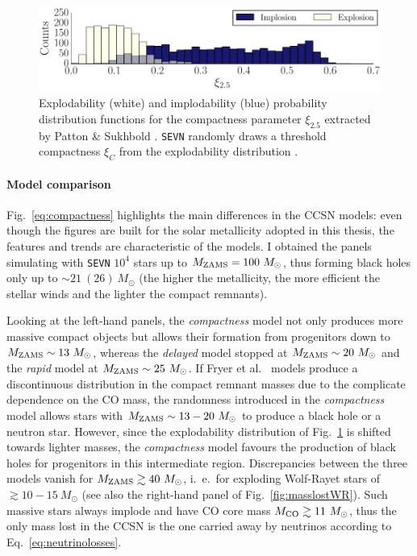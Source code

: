 \documentclass[a4paper,titlepage]{book}     	%
\newcommand{\sun}{\ensuremath{_\odot}}
\newcommand{\mzams}{M_\textup{ZAMS}}
\newcommand{\msun}{\ensuremath{M\sun}}
\begin{document}
\begin{figure}
	\centering
	\includegraphics[width=.9\textwidth]{./images/compactness.png}	
	\caption{Explodability (white) and implodability (blue) probability distribution functions for the compactness parameter $\xi_{2.5}$ extracted by Patton \& Sukhbold \cite{COcollapse}. \texttt{SEVN} randomly draws a threshold compactness $\xi_C$ from the explodability distribution \cite{mapelli2020_compactness}.}\label{fig:compactness}
\end{figure}


\paragraph{Model comparison} Fig.\ \ref{eq:compactness} highlights the main differences in the CCSN models: even though the figures are built for the solar metallicity adopted in this thesis, the features and trends are characteristic of the models. I obtained the panels simulating with \texttt{SEVN} $10^4$ stars up to $\mzams = 100~\msun$, thus forming black holes only up to $\sim 21~(26)~\msun$ (the higher the metallicity, the more efficient the stellar winds and the lighter the compact remnants).

Looking at the left-hand panels, the \emph{compactness} model not only produces more massive compact objects but allows their formation from progenitors down to $\mzams \sim 13~\msun$, whereas the \emph{delayed} model stopped at $\mzams \sim 20~\msun$ and the \emph{rapid} model at $\mzams \sim 25~\msun$. If Fryer et al.\ \cite{Fryer2012} models produce a discontinuous distribution in the compact remnant masses due to the complicate dependence on the CO mass, the randomness introduced in the \emph{compactness} model allows stars with $\mzams \sim 13-20~\msun$ to produce a black hole or a neutron star. However, since the explodability distribution of Fig.\ \ref{fig:compactness} is shifted towards lighter masses, the \emph{compactness} model favours the production of black holes for progenitors in this intermediate region. Discrepancies between the three models vanish for $\mzams \gtrsim 40~\msun$, i.\ e.\ for exploding Wolf-Rayet stars of $\gtrsim 10-15~\msun$ (see also the right-hand panel of Fig.\ \ref{fig:masslostWR}). Such massive stars always implode and have CO core mass $M_{\rm CO} \gtrsim 11~\msun$, thus the only mass lost in the CCSN is the one carried away by neutrinos according to Eq.\ \ref{eq:neutrinolosses}. 
\end{document}
